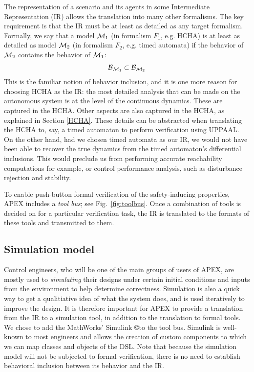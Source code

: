 The representation of a scenario and its agents in some Intermediate Representation (IR) allows the translation into many other formalisms.
The key requirement is that the IR must be at least as detailed as any target formalism.
Formally, we say that a model $\mathcal{M}_1$ (in formalism $F_1$, e.g. HCHA) is at least as detailed as model $\mathcal{M}_2$ (in formalism $F_2$, e.g. timed automata) if the behavior of $\mathcal{M}_2$ contains the behavior of $\mathcal{M}_1$: 
\[\mathcal{B}_{\mathcal{M}_1} \subset \mathcal{B}_{\mathcal{M}_2}\]
This is the familiar notion of behavior inclusion, and it is one more reason for choosing HCHA as the IR:
the most detailed analysis that can be made on the autonomous system is at the level of the continuous dynamics.
These are captured in the HCHA. 
Other aspects are also captured in the HCHA, as explained in Section \ref{HCHA}.
These details can be abstracted when translating the HCHA to, say, a timed automaton to perform verification using UPPAAL.
On the other hand, had we chosen timed automata as our IR, we would not have been able to recover the true dynamics from the timed automaton's differential inclusions. 
This would preclude us from performing accurate reachability computations for example, or control performance analysis, such as disturbance rejection and stability.


To enable push-button formal verification of the safety-inducing properties, APEX includes a \emph{tool bus}; see Fig.~\ref{fig:toolbus}.
Once a combination of tools is decided on for a particular verification task, the IR is translated to the formats of these tools and transmitted to them.

\subsection{Simulation model}
\label{simulation model}

Control engineers, who will be one of the main groups of users of APEX, are mostly used to \emph{simulating} their designs under certain initial conditions and inputs from the environment to help determine correctness. 
Simulation is also a quick way to get a qualitiative idea of what the system does, and is used iteratively to improve the design.
It is therefore important for APEX to provide a translation from the IR to a simulation tool, in addition to the translation to formal tools. 
We chose to add the MathWorks' Simulink \copyright to the tool bus.
Simulink is well-known to most engineers and allows the creation of custom components to which we can map classes and objects of the DSL.
Note that because the simulation model will not be subjected to formal verification, there is no need to establish behavioral inclusion between its behavior and the IR.

